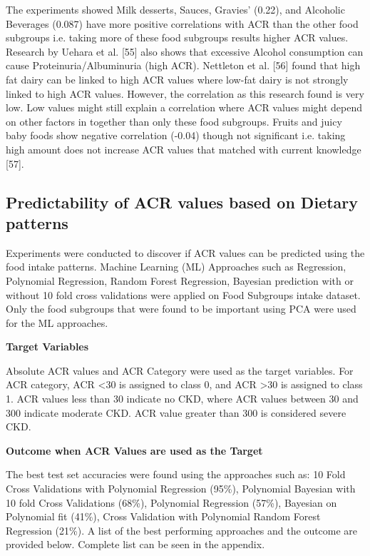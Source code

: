 \noindent The experiments showed  Milk desserts, Sauces, Gravies’ (0.22), and Alcoholic Beverages (0.087) have more positive correlations with ACR than the other food subgroups  i.e. taking more of these food subgroups results higher ACR values. Research by Uehara et al. [55] also shows that excessive Alcohol consumption can cause Proteinuria/Albuminuria (high ACR). Nettleton et al. [56] found that high fat dairy can be linked to high ACR values where low-fat dairy is not strongly linked to high ACR values. However, the correlation as this research found is very low. Low values might still explain a correlation where ACR values might depend on other factors in together than only these food subgroups. Fruits and juicy baby foods show negative correlation (-0.04) though not significant i.e. taking high amount does not increase ACR values that matched with current knowledge [57].

\subsection{Predictability of ACR values based on Dietary patterns}
Experiments were conducted to discover if ACR values can be predicted using the food intake patterns. Machine Learning (ML) Approaches such as Regression, Polynomial Regression, Random Forest Regression, Bayesian prediction with or without 10 fold cross validations were applied on Food Subgroups intake dataset. Only the food subgroups that were found to be important using PCA were used for the ML approaches.

\noindent \textbf{Target Variables}

\noindent Absolute ACR values and ACR Category were used as the target variables.  For ACR category, ACR  \textless   30 is assigned to class 0, and ACR  \textgreater  30 is assigned to class 1. ACR values less than 30 indicate no CKD, where ACR values between 30 and 300 indicate moderate CKD. ACR value greater than 300 is considered severe CKD.

\noindent \textbf{Outcome when ACR Values are used as the Target }

\noindent The best test set accuracies were found using the approaches such as: 10 Fold Cross Validations with Polynomial Regression (95\%), Polynomial Bayesian with 10 fold Cross Validations (68\%), Polynomial Regression (57\%), Bayesian on Polynomial fit (41\%), Cross Validation with Polynomial Random Forest Regression (21\%). A list of the best performing approaches and the outcome are provided below. Complete list can be seen in the appendix. 

